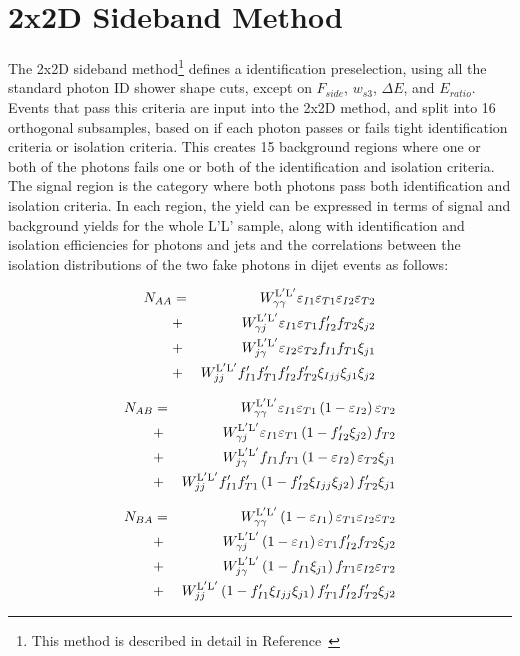 \chapter{2x2D Sideband Method}\label{app:2x2d}

The 2x2D sideband method\footnote{This method is described in detail in Reference~\cite{2x2d-definition}} defines a \LoosePrime identification preselection, using all the standard photon ID shower shape cuts, except on $F_{side}$, $w_{s3}$, $\Delta E$, and $E_{ratio}$. Events that pass this criteria are input into the 2x2D method, and split into 16 orthogonal subsamples, based on if each photon passes or fails tight identification criteria or isolation criteria. This creates 15 background regions where one or both of the photons fails one or both of the identification and isolation criteria. The signal region is the category where both photons pass both identification and isolation criteria. In each region, the yield can be expressed in terms of signal and background yields for the whole L'L' sample, along with identification and isolation efficiencies for photons and jets and the correlations between the isolation distributions of the two fake photons in dijet events as follows:

\begin{eqnarray}
    N_{AA} &=& W_{\gamma\gamma}^{\mathrm{L}^{\prime}\mathrm{L}^{\prime}} \varepsilon_{I1} \varepsilon_{T1} \varepsilon_{I2} \varepsilon_{T2} \nonumber \\
    &+& W_{\gamma j}^{\mathrm{L}^{\prime}\mathrm{L}^{\prime}} \varepsilon_{I1} \varepsilon_{T1} f^{\prime}_{I2} f_{T2} \xi_{j2} \nonumber \\
    &+& W_{j \gamma}^{\mathrm{L}^{\prime}\mathrm{L}^{\prime}} \varepsilon_{I2} \varepsilon_{T2} f_{I1} f_{T1} \xi_{j1}  \nonumber \\
    &+& W_{jj}^{\mathrm{L}^{\prime}\mathrm{L}^{\prime}} f^{\prime}_{I1} f^{\prime}_{T1} f^{\prime}_{I2} f^{\prime}_{T2} \xi_{Ijj} \xi_{j1} \xi_{j2}
  \end{eqnarray}
  
  \begin{eqnarray}
    N_{AB} &=& W_{\gamma\gamma}^{\mathrm{L}^{\prime}\mathrm{L}^{\prime}} \varepsilon_{I1} \varepsilon_{T1} \left(1-\varepsilon_{I2}\right) \varepsilon_{T2} \nonumber \\
    &+& W_{\gamma j}^{\mathrm{L}^{\prime}\mathrm{L}^{\prime}}\varepsilon_{I1} \varepsilon_{T1}   \left(1-f^{\prime}_{I2} \xi_{j2}\right)f_{T2}   \nonumber \\
    &+& W_{j \gamma}^{\mathrm{L}^{\prime}\mathrm{L}^{\prime}}f_{I1} f_{T1} \left(1-\varepsilon_{I2} \right)\varepsilon_{T2}  \xi_{j1}  \nonumber \\
    &+& W_{jj}^{\mathrm{L}^{\prime}\mathrm{L}^{\prime}}f^{\prime}_{I1} f^{\prime}_{T1}\left(1-f^{\prime}_{I2}\xi_{Ijj} \xi_{j2}\right) f^{\prime}_{T2}\xi_{j1}
  \end{eqnarray}
  
  \begin{eqnarray}
    N_{BA} &=& W_{\gamma\gamma}^{\mathrm{L}^{\prime}\mathrm{L}^{\prime}} \left(1-\varepsilon_{I1}\right) \varepsilon_{T1} \varepsilon_{I2} \varepsilon_{T2} \nonumber \\
    &+& W_{\gamma j}^{\mathrm{L}^{\prime}\mathrm{L}^{\prime}}\left(1-\varepsilon_{I1} \right)\varepsilon_{T1} f^{\prime}_{I2} f_{T2}  \xi_{j2}   \nonumber \\
    &+& W_{j \gamma}^{\mathrm{L}^{\prime}\mathrm{L}^{\prime}} \left(1-f_{I1}  \xi_{j1}\right)f_{T1} \varepsilon_{I2} \varepsilon_{T2}   \nonumber \\
    &+& W_{jj}^{\mathrm{L}^{\prime}\mathrm{L}^{\prime}}\left(1-f^{\prime}_{I1}\xi_{Ijj}\xi_{j1}\right) f^{\prime}_{T1} f^{\prime}_{I2} f^{\prime}_{T2}\xi_{j2}
  \end{eqnarray}
  
